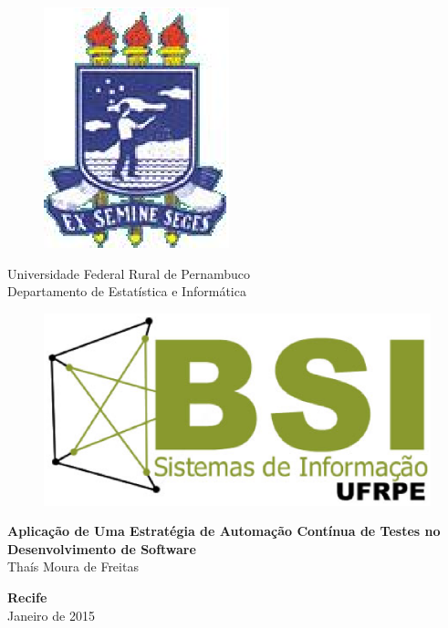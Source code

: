 \begin{figure}[h]
\leavevmode
\begin{minipage}{\textwidth}
\includegraphics[scale=0.7]
{prefacios/capa/logo-ufrpe.eps}
\end{minipage}
\end{figure}
\vspace{-3.5cm}
{\bf
\begin{center}
{\Large
\hspace*{0cm}Universidade Federal Rural de Pernambuco \\
\hspace*{0cm}Departamento de Estatística e Informática}\\
\end{center}
}
\noindent
\begin{figure}[h]
\centering
\includegraphics[scale=0.5]{prefacios/capa/logo-bsi-presencial-v3-amp.eps}
\end{figure}


\vspace{2.5cm}
\noindent
\begin{center}
{\Large \bf Aplicação de Uma Estratégia de Automação Contínua de Testes no Desenvolvimento de Software} \\[5cm]
{\Large Thaís Moura de Freitas}\\[6mm]
\end{center}


\vspace{1.5cm}
\begin{center}
{\large {\bf Recife}\\[6mm]
Janeiro de 2015}
\end{center}
\newpage
